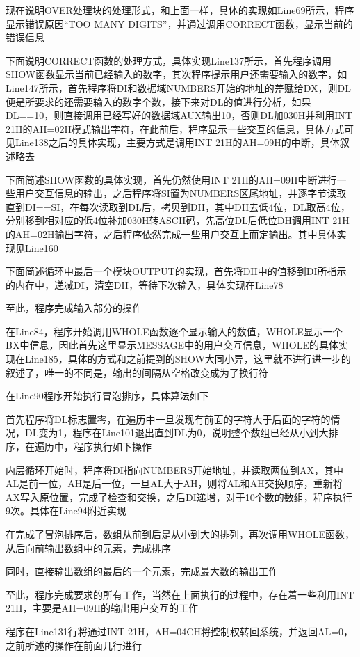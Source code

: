 \documentclass[UTF8,a4paper]{ctexart}
\begin{document}
现在说明OVER处理块的处理形式，和上面一样，具体的实现如Line69所示，程序显示错误原因“TOO MANY DIGITS”，并通过调用CORRECT函数，显示当前的错误信息

下面说明CORRECT函数的处理方式，具体实现Line137所示，首先程序调用SHOW函数显示当前已经输入的数字，其次程序提示用户还需要输入的数字，如Line147所示，首先程序将DI和数据域NUMBERS开始的地址的差赋给DX，则DL便是所要求的还需要输入的数字个数，接下来对DL的值进行分析，如果DL==10，则直接调用已经写好的数据域AUX输出10，否则DL加030H并利用INT 21H的AH=02H模式输出字符，在此前后，程序显示一些交互的信息，具体方式可见Line138之后的具体实现，主要方式是调用INT 21H的AH=09H的中断，具体叙述略去

下面简述SHOW函数的具体实现，首先仍然使用INT 21H的AH=09H中断进行一些用户交互信息的输出，之后程序将SI置为NUMBERS区尾地址，并逐字节读取直到DI==SI，在每次读取到DL后，拷贝到DH，其中DH去低4位，DL取高4位，分别移到相对应的低4位补加030H转ASCII码，先高位DL后低位DH调用INT 21H的AH=02H输出字符，之后程序依然完成一些用户交互上而定输出。其中具体实现见Line160

下面简述循环中最后一个模块OUTPUT的实现，首先将DH中的值移到DI所指示的内存中，递减DI，清空DH，等待下次输入，具体实现在Line78

至此，程序完成输入部分的操作

在Line84，程序开始调用WHOLE函数逐个显示输入的数值，WHOLE显示一个BX中信息，因此首先这里显示MESSAGE中的用户交互信息，WHOLE的具体实现在Line185，具体的方式和之前提到的SHOW大同小异，这里就不进行进一步的叙述了，唯一的不同是，输出的间隔从空格改变成为了换行符

在Line90程序开始执行冒泡排序，具体算法如下

首先程序将DL标志置零，在遍历中一旦发现有前面的字符大于后面的字符的情况，DL变为1，程序在Line101退出直到DL为0，说明整个数组已经从小到大排序，在遍历中，程序执行如下操作

内层循环开始时，程序将DI指向NUMBERS开始地址，并读取两位到AX，其中AL是前一位，AH是后一位，一旦AL大于AH，则将AL和AH交换顺序，重新将AX写入原位置，完成了检查和交换，之后DI递增，对于10个数的数组，程序执行9次。具体在Line94附近实现

在完成了冒泡排序后，数组从前到后是从小到大的排列，再次调用WHOLE函数，从后向前输出数组中的元素，完成排序

同时，直接输出数组的最后的一个元素，完成最大数的输出工作

至此，程序完成要求的所有工作，当然在上面执行的过程中，存在着一些利用INT 21H，主要是AH=09H的输出用户交互的工作

程序在Line131行将通过INT 21H，AH=04CH将控制权转回系统，并返回AL=0，之前所述的操作在前面几行进行
\end{document}
